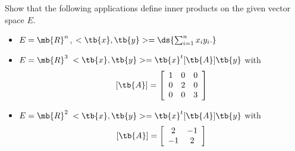 \bexo
Show that the following applications define inner products on the given vector space $E$.
\begin{itemize}
\item  $E=\mb{R}^n$, $<\tb{x},\tb{y}>=\ds{\sum_{i=1}^n x_iy_i.}$ 
\item $E=\mb{R}^3$ $<\tb{x},\tb{y}>=\tb{x}^t[\tb{A}]\tb{y}$ with $$[\tb{A}]=\left[
\begin{array}{ccc}
1 & 0&0\\
0 & 2&0\\
0 &0 &3
\end{array}
\right] $$ 
\item $E=\mb{R}^2$ $<\tb{x},\tb{y}>=\tb{x}^t[\tb{A}]\tb{y}$ with $$[\tb{A}]=\left[
\begin{array}{cc}
2 & -1\\
-1 & 2
\end{array}
\right] $$ 
\end{itemize}  
\eexo
\solution{
 

}